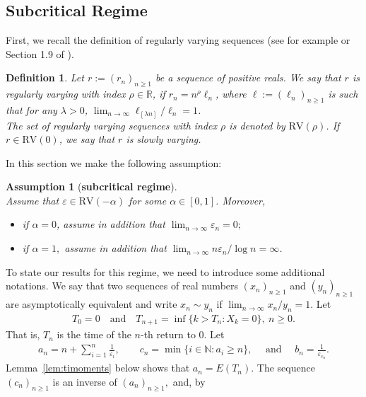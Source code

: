 \documentclass[12pt]{amsart}
\newtheorem{definition}[theorem]{Definition}
\newtheorem{assume}[theorem]{Assumption}
\begin{document}
\subsection{Subcritical Regime}
\label{subs1}
First, we recall the definition of regularly varying sequences (see for example  \cite{rvs} or
Section 1.9 of \cite{rvbook}).
\begin{definition}
\label{defrv}
Let $r:=(r_n)_{n\ge 1}$ be a sequence of positive reals.
We say that $r$ is {\em regularly varying} with index $\rho\in{{\mathbb R}}$, if   $r_n=n^{\rho} \ell_n$, where
$\ell := (\ell_n)_{n\ge 1}$ is such that for any $\lambda>0$,
$\lim_{n\to\infty} \ell_{[\lambda n]}/\ell_n=1$. \\
The set of regularly varying sequences with index $\rho$ is denoted by $\mbox{RV}(\rho)$.
If $r\in  \mbox{RV}(0)$, we say that $r$ is {\em slowly varying}.
\end{definition}
In this section we make the following assumption:
\begin{assume}
[{\bf subcritical regime}]
\label{maina}~\\
Assume that ${\varepsilon} \in \mbox{RV}(-\alpha)$ for some $\alpha \in [0,1]$. Moreover,
\begin{itemize}
\item
if $\alpha =0$, assume in addition that $\lim_{n\to\infty} {\varepsilon}_n = 0;$
\item
if $\alpha =1,$ assume in addition that $\lim_{n\to\infty} n{\varepsilon}_n/ \log n = \infty$.
\end{itemize}
\end{assume}
To state our results for this regime, we need to introduce some
additional notations. We say that two sequences of real numbers
$(x_n)_{n\ge 1}$ and $(y_n)_{n\ge 1}$ are asymptotically equivalent
and write $x_n \sim y_n$ if $\lim_{n\to\infty} x_n / y_n=1$. Let
\begin{eqnarray} \label{tin} T_0=0\quad \mbox{and}\quad T_{n+1}=\inf\{k>
T_n:X_k=0\},~n\ge 0.\end{eqnarray} That is, $T_n$ is the time of the $n$-th
return to $0$. Let \begin{eqnarray} \label{aen} a_n=n+\sum_{i=1}^n
{\frac {\displaystyle {1}}{\displaystyle {{\varepsilon}_i} }},\qquad c_n=\min\{i\in{{\mathbb N}}:a_i \geq n\},\quad
\mbox{~and~}\quad b_n=\frac{1}{{\varepsilon}_{c_{n}}}. \end{eqnarray}
Lemma~\ref{lem:timoments} below shows that $a_n=E (T_n).$ The
sequence $(c_n)_{n\ge 1}$ is an inverse of $(a_n)_{n\ge 1},$ and, by
\end{document}
